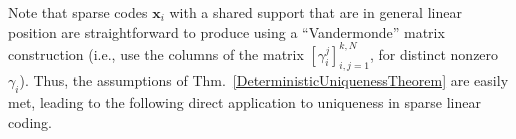 \documentclass[9pt,twocolumn]{pnas-new}
\renewcommand{\eqref}[1]{\textnormal{[\ref{#1}]}}
\begin{document}
Note that sparse codes $\mathbf{x}_i$ with a shared support that are in general linear position are straightforward to produce using a ``Vandermonde'' matrix construction (i.e., use the columns of the matrix $[\gamma_{i}^j]_{i,j=1}^{k,N}$, for distinct nonzero $\gamma_i$).  Thus, the assumptions of Thm.~\ref{DeterministicUniquenessTheorem} are easily met, leading to the following direct application to uniqueness in sparse linear coding. %
%
%
%
\end{document}
